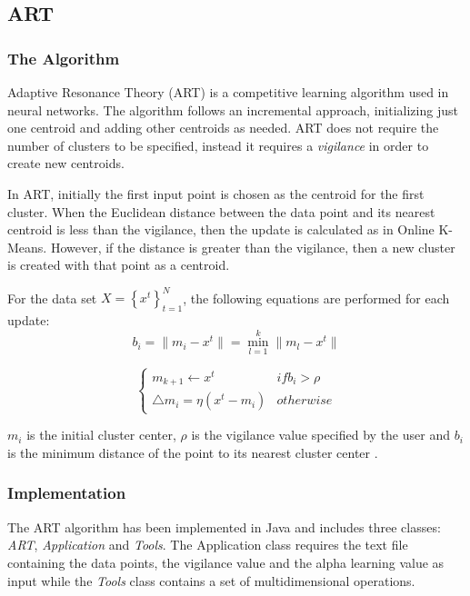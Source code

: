 \documentclass{lmproj}
\begin{document}
\subsection{ART}
\subsubsection{The Algorithm}
Adaptive Resonance Theory (ART) is a competitive learning algorithm used in neural networks. The algorithm follows an incremental approach, initializing just one centroid and adding other centroids as needed. ART does not require the number of clusters to be specified, instead it requires a \textit{vigilance} in order to create new centroids.

In ART, initially the first input point is chosen as the centroid for the first cluster. When the Euclidean distance between the data point and its nearest centroid is less than the vigilance, then the update is calculated as in Online K-Means. However, if the distance is greater than the vigilance, then a new cluster is created with that point as a centroid.

For the data set $X = \left\{ {x^{t}}\right\}_{t=1}^N$, the following equations are performed for each update:
\begin{equation}
b_{i} = \parallel{m_{i}} - x^{t}\parallel  = \min_{l=1}^k \parallel  m_{l} - x^{t}∥
\end{equation}
 
\begin{equation}
\begin{cases}
m_{k+1}\leftarrow x^{t} & if b_{i}>\rho
\\\triangle{m_{i}}=\eta\left(x^{t} - m_{i}\right) & otherwise
\end{cases}
\end{equation}

$m_{i}$ is the initial cluster center, $\rho$ is the vigilance value specified by the user and $b_{i}$ is the minimum distance of the point to its nearest cluster center \cite{Clustering}. 
 
\subsubsection{Implementation}
The ART algorithm has been implemented in Java and includes three classes: \textit{ART}, \textit{Application} and \textit{Tools}. The Application class requires the text file containing the data points, the vigilance value and the alpha learning value as input while the \textit{Tools} class contains a set of multidimensional operations.
\end{document}
